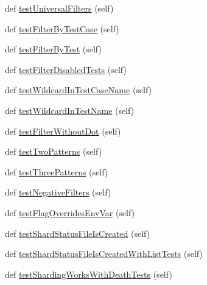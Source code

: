 \begin{DoxyCompactItemize}
\item 
def \hyperlink{classgtest__filter__unittest_1_1_g_test_filter_unit_test_ae9da48a79483e22e3f986e57de0dee37}{test\+Universal\+Filters} (self)
\item 
def \hyperlink{classgtest__filter__unittest_1_1_g_test_filter_unit_test_ac59206c94324afdc09adbe5853856174}{test\+Filter\+By\+Test\+Case} (self)
\item 
def \hyperlink{classgtest__filter__unittest_1_1_g_test_filter_unit_test_aaea691324a6c0765403b26a895702a63}{test\+Filter\+By\+Test} (self)
\item 
def \hyperlink{classgtest__filter__unittest_1_1_g_test_filter_unit_test_a6d962adae2ee2697b3b92e84b60a795a}{test\+Filter\+Disabled\+Tests} (self)
\item 
def \hyperlink{classgtest__filter__unittest_1_1_g_test_filter_unit_test_af855132606c1fa02fb765e8619108114}{test\+Wildcard\+In\+Test\+Case\+Name} (self)
\item 
def \hyperlink{classgtest__filter__unittest_1_1_g_test_filter_unit_test_a9b1e6b35e158d7c6d11b8f4d2cb600cb}{test\+Wildcard\+In\+Test\+Name} (self)
\item 
def \hyperlink{classgtest__filter__unittest_1_1_g_test_filter_unit_test_a874aea28690300d8c0dc0910304f7ab2}{test\+Filter\+Without\+Dot} (self)
\item 
def \hyperlink{classgtest__filter__unittest_1_1_g_test_filter_unit_test_a2563885e647205586b135c5ead55e6ab}{test\+Two\+Patterns} (self)
\item 
def \hyperlink{classgtest__filter__unittest_1_1_g_test_filter_unit_test_af4858e153245f0974632fd36dc1dd804}{test\+Three\+Patterns} (self)
\item 
def \hyperlink{classgtest__filter__unittest_1_1_g_test_filter_unit_test_aff878809d524797f62e2fe38bbfcc8da}{test\+Negative\+Filters} (self)
\item 
def \hyperlink{classgtest__filter__unittest_1_1_g_test_filter_unit_test_a81e4256da0e0ad8cb4b764ffd573cc6d}{test\+Flag\+Overrides\+Env\+Var} (self)
\item 
def \hyperlink{classgtest__filter__unittest_1_1_g_test_filter_unit_test_a7a2c7b8d758abba0ae883bbb272f344b}{test\+Shard\+Status\+File\+Is\+Created} (self)
\item 
def \hyperlink{classgtest__filter__unittest_1_1_g_test_filter_unit_test_a1dac68948f6170e39ae9ee7bca0bc1eb}{test\+Shard\+Status\+File\+Is\+Created\+With\+List\+Tests} (self)
\item 
def \hyperlink{classgtest__filter__unittest_1_1_g_test_filter_unit_test_a4b4f7428d9219dff5960968477927626}{test\+Sharding\+Works\+With\+Death\+Tests} (self)
\end{DoxyCompactItemize}


